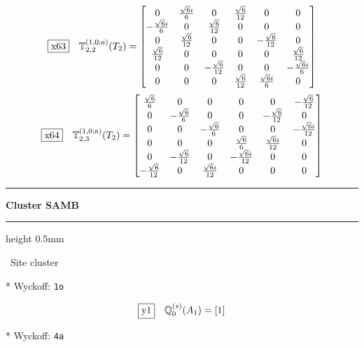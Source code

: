 \documentclass[fleqn,10pt,landscape]{jsarticle}
\begin{document}
\begin{dmath*}
\fbox{x63}\quad \mathbb{T}_{2,2}^{(1,0;a)}(T_{2})=\begin{bmatrix} 0 & \frac{\sqrt{6} i}{6} & 0 & \frac{\sqrt{6}}{12} & 0 & 0 \\ - \frac{\sqrt{6} i}{6} & 0 & \frac{\sqrt{6}}{12} & 0 & 0 & 0 \\ 0 & \frac{\sqrt{6}}{12} & 0 & 0 & - \frac{\sqrt{6}}{12} & 0 \\ \frac{\sqrt{6}}{12} & 0 & 0 & 0 & 0 & \frac{\sqrt{6}}{12} \\ 0 & 0 & - \frac{\sqrt{6}}{12} & 0 & 0 & - \frac{\sqrt{6} i}{6} \\ 0 & 0 & 0 & \frac{\sqrt{6}}{12} & \frac{\sqrt{6} i}{6} & 0 \end{bmatrix}
\end{dmath*}
\begin{dmath*}
\fbox{x64}\quad \mathbb{T}_{2,3}^{(1,0;a)}(T_{2})=\begin{bmatrix} \frac{\sqrt{6}}{6} & 0 & 0 & 0 & 0 & - \frac{\sqrt{6}}{12} \\ 0 & - \frac{\sqrt{6}}{6} & 0 & 0 & - \frac{\sqrt{6}}{12} & 0 \\ 0 & 0 & - \frac{\sqrt{6}}{6} & 0 & 0 & - \frac{\sqrt{6} i}{12} \\ 0 & 0 & 0 & \frac{\sqrt{6}}{6} & \frac{\sqrt{6} i}{12} & 0 \\ 0 & - \frac{\sqrt{6}}{12} & 0 & - \frac{\sqrt{6} i}{12} & 0 & 0 \\ - \frac{\sqrt{6}}{12} & 0 & \frac{\sqrt{6} i}{12} & 0 & 0 & 0 \end{bmatrix}
\end{dmath*}
\vspace{5mm}
\noindent \rule[0.5mm]{5mm}{0.5mm}\hspace{3mm}\textbf{Cluster SAMB}\hspace{3mm}\leaders\hrule height 0.5mm\hfill\kern0pt
\vspace{3mm}

\noindent\textbullet\, Site cluster

\vspace{5mm}

\noindent ** Wyckoff: \texttt{1o}

\begin{dmath*}
\fbox{y1}\quad \mathbb{Q}_{0}^{(s)}(A_{1})=\left[ 1 \right]
\end{dmath*}
\vspace{5mm}

\noindent ** Wyckoff: \texttt{4a}
\end{document}

